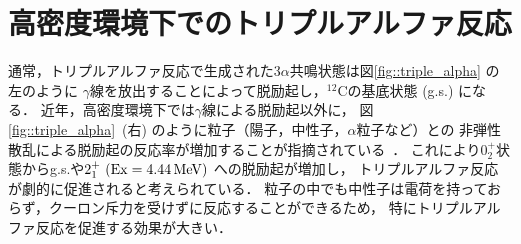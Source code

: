 \documentclass[../master]{subfiles}
\begin{document}
\section{高密度環境下でのトリプルアルファ反応}
\label{seq::triplealphareaction}
通常，トリプルアルファ反応で生成された$3\alpha$共鳴状態は図\ref{fig::triple_alpha} の左のように
$\gamma$線を放出することによって脱励起し，${}^{12}\mathrm{C}$の基底状態 (g.s.) になる．
近年，高密度環境下では$\gamma$線による脱励起以外に，
図\ref{fig::triple_alpha}~(右) のように粒子（陽子，中性子，$\alpha$粒子など）との
非弾性散乱による脱励起の反応率が増加することが指摘されている~\cite{hotdensemedium}．
これにより$0_2^+$状態からg.s.や$2_{1}^{+}\ ({\rm Ex} = \SI{4.44}{\mega\electronvolt})$ への脱励起が増加し，
トリプルアルファ反応が劇的に促進されると考えられている．
粒子の中でも中性子は電荷を持っておらず，クーロン斥力を受けずに反応することができるため，
特にトリプルアルファ反応を促進する効果が大きい．


\end{document}
